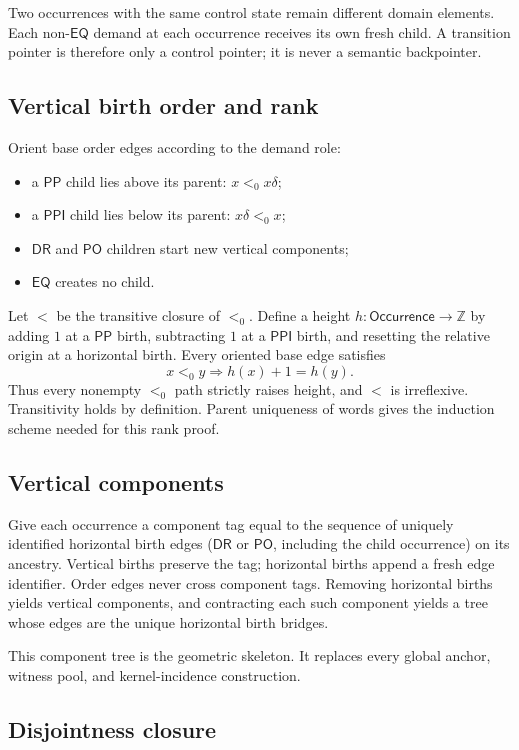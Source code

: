 \documentclass[11pt]{article}
\newcommand{\PP}{\mathsf{PP}}
\newcommand{\PPI}{\mathsf{PPI}}
\newcommand{\PO}{\mathsf{PO}}
\newcommand{\DR}{\mathsf{DR}}
\newcommand{\EQ}{\mathsf{EQ}}
\begin{document}
Two occurrences with the same control state remain different domain elements. Each
non-$\EQ$ demand at each occurrence receives its own fresh child. A transition pointer is
therefore only a control pointer; it is never a semantic backpointer.

\subsection{Vertical birth order and rank}

Orient base order edges according to the demand role:

\begin{itemize}
  \item a $\PP$ child lies above its parent: $x<_{0}x\delta$;
  \item a $\PPI$ child lies below its parent: $x\delta<_{0}x$;
  \item $\DR$ and $\PO$ children start new vertical components;
  \item $\EQ$ creates no child.
\end{itemize}

Let $<$ be the transitive closure of $<_{0}$. Define a height
$h:\mathsf{Occurrence}\to\mathbb{Z}$ by adding $1$ at a $\PP$ birth, subtracting $1$ at a
$\PPI$ birth, and resetting the relative origin at a horizontal birth. Every oriented
base edge satisfies
\[
  x<_{0}y\Longrightarrow h(x)+1=h(y).
\]
Thus every nonempty $<_{0}$ path strictly raises height, and $<$ is irreflexive.
Transitivity holds by definition. Parent uniqueness of words gives the induction scheme
needed for this rank proof.

\subsection{Vertical components}

Give each occurrence a component tag equal to the sequence of uniquely identified
horizontal birth edges ($\DR$ or $\PO$, including the child occurrence) on its ancestry.
Vertical births preserve the tag; horizontal births append a fresh edge identifier.
Order edges never cross component tags. Removing horizontal births yields vertical
components, and contracting each such component yields a tree whose edges are the unique
horizontal birth bridges.

This component tree is the geometric skeleton. It replaces every global anchor, witness
pool, and kernel-incidence construction.

\subsection{Disjointness closure}
\end{document}
